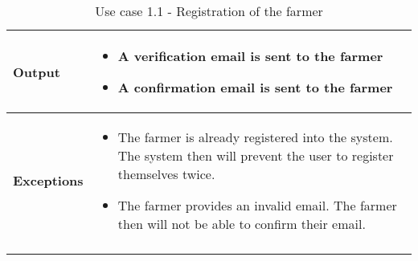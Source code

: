 \begin{longtable}[H]{ | l | p{10cm} | }
{\cellcolor[rgb]{0.753,0.753,0.753}}\textbf{Output} & 
\begin{itemize}
    \item A verification email is sent to the farmer
    \item A confirmation email is sent to the farmer
\end{itemize}
\\ \hline
{\cellcolor[rgb]{0.753,0.753,0.753}}\textbf{Exceptions} &
\begin{itemize}
    \item The farmer is already registered into the system. The system then will prevent the user to register themselves twice.
    \item The farmer provides an invalid email. The farmer then will not be able to confirm their email.
\end{itemize}
\\ \hline
\caption{Use case 1.1 - Registration of the farmer}
\\
\end{longtable}